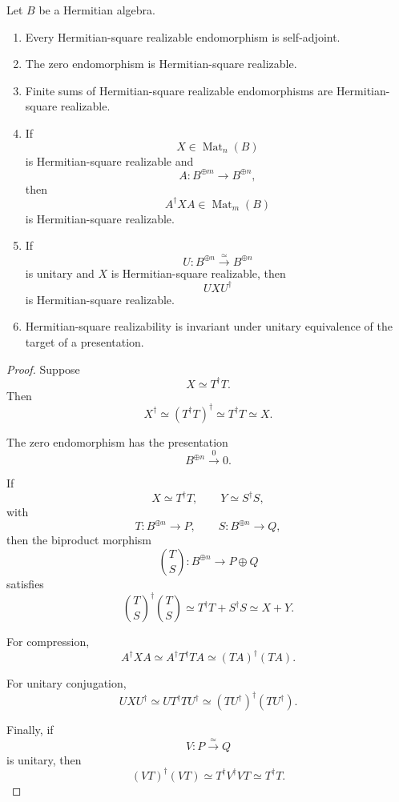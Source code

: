 \begin{proposition}
\label{prop:higher-hermitian-square-calculus}
Let \(B\) be a Hermitian algebra.

\begin{enumerate}
  \item Every Hermitian-square realizable endomorphism is self-adjoint.

  \item The zero endomorphism is Hermitian-square realizable.

  \item Finite sums of Hermitian-square realizable endomorphisms are
  Hermitian-square realizable.

  \item If
  \[
    X\in\operatorname{Mat}_n(B)
  \]
  is Hermitian-square realizable and
  \[
    A:B^{\oplus m}\to B^{\oplus n},
  \]
  then
  \[
    A^\dagger XA
    \in
    \operatorname{Mat}_m(B)
  \]
  is Hermitian-square realizable.

  \item If
  \[
    U:B^{\oplus n}\xrightarrow{\simeq}B^{\oplus n}
  \]
  is unitary and \(X\) is Hermitian-square realizable, then
  \[
    UXU^\dagger
  \]
  is Hermitian-square realizable.

  \item Hermitian-square realizability is invariant under unitary equivalence
  of the target of a presentation.
\end{enumerate}
\end{proposition}

\begin{proof}
Suppose
\[
  X\simeq T^\dagger T.
\]
Then
\[
  X^\dagger
  \simeq
  (T^\dagger T)^\dagger
  \simeq
  T^\dagger T
  \simeq
  X.
\]

The zero endomorphism has the presentation
\[
  B^{\oplus n}\xrightarrow{0}0.
\]

If
\[
  X\simeq T^\dagger T,
  \qquad
  Y\simeq S^\dagger S,
\]
with
\[
  T:B^{\oplus n}\to P,
  \qquad
  S:B^{\oplus n}\to Q,
\]
then the biproduct morphism
\[
  \binom{T}{S}:
  B^{\oplus n}
  \longrightarrow
  P\oplus Q
\]
satisfies
\[
  \binom{T}{S}^{\dagger}
  \binom{T}{S}
  \simeq
  T^\dagger T+S^\dagger S
  \simeq
  X+Y.
\]

For compression,
\[
  A^\dagger XA
  \simeq
  A^\dagger T^\dagger TA
  \simeq
  (TA)^\dagger(TA).
\]

For unitary conjugation,
\[
  UXU^\dagger
  \simeq
  UT^\dagger TU^\dagger
  \simeq
  (TU^\dagger)^\dagger(TU^\dagger).
\]

Finally, if
\[
  V:P\xrightarrow{\simeq}Q
\]
is unitary, then
\[
  (VT)^\dagger(VT)
  \simeq
  T^\dagger V^\dagger VT
  \simeq
  T^\dagger T.
\]
\end{proof}

